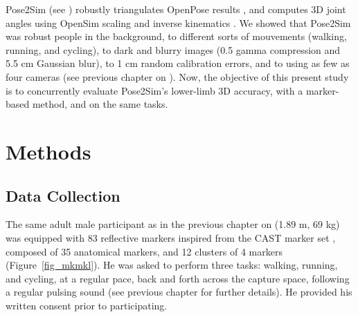 Pose2Sim (see  \cite{Pagnon2022b}) robustly triangulates OpenPose results \cite{Cao2019}, and computes 3D joint angles using OpenSim scaling and inverse kinematics \cite{Delp2007, Seth2018}. We showed that Pose2Sim was robust people in the background, to different sorts of mouvements (walking, running, and cycling), to dark and blurry images (0.5 gamma compression and 5.5 cm Gaussian blur), to 1 cm random calibration errors, and to using as few as four cameras (see previous chapter on  \cite{Pagnon2021}). Now, the objective of this present study is to concurrently evaluate Pose2Sim’s lower-limb 3D accuracy, with a marker-based method, and on the same tasks.


\section{Methods}\label{sec:accuracy_methods}
\subsection{Data Collection}

The same adult male participant as in the previous chapter on  (1.89 m, 69 kg) was equipped with 83 reflective markers inspired from the CAST marker set \cite{Cappozzo1995}, composed of 35 anatomical markers, and 12 clusters of 4 markers (Figure~\ref{fig_mkmkl}). He was asked to perform three tasks: walking, running, and cycling, at a regular pace, back and forth across the capture space, following a regular pulsing sound (see previous chapter for further details). He provided his written consent prior to participating.

